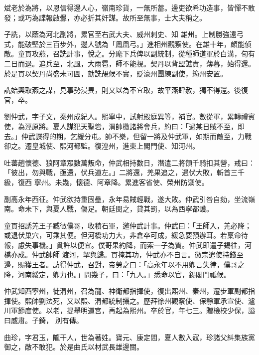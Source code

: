 \begin{pinyinscope}
 斌老於為將，以恩信得邊人心，嶺南珍貨，一無所蓄。邊吏欲希功造事，皆憚不敢發；或巧為諜報啟釁，亦必折其奸謀。故所至無事，士大夫稱之。



 子詵，以蔭為河北副將，累官至右武大夫、威州刺史、知
 雄州。上制勝強遠弓式，能破堅於三百步外，邊人號為「鳳凰弓。」進相州觀察使。在雄十年，頗能偵敵。童貫攻燕，召詵計事，悅之。分麾下兵俾以副統制，從種師道軍於白溝，旬有二日而退。追兵至，北風，大雨雹，師不能視。契丹以背盟譙責，薄暮，始得還。於是貫以契丹尚盛未可圖，劾詵覘候不實，貶濠州團練副使，筠州安置。



 詵始興取燕之謀，見事勢浸異，則又以為不宜取，故平燕肆赦，獨不得還。後復官，卒。



 劉仲武，字子文，秦州成紀人。熙寧中，試射殿庭異等，補官。數從軍，累轉禮賓使，為涇原將。夏人謀犯天聖砦，渭帥檄諸將會兵，約曰：「過某日賊不至，即去。」仲武諜得的期，乞緩分屯。帥不樂，但留一將及仲武軍，如期而敵至，力戰卻之。遷皇城使、熙河都監。復湟州，進東上閣門使、知河州。



 吐蕃趙懷德、狼阿章眾數萬叛命，仲武相持數日，潛遣二將領千騎扣其營，戒曰：「彼出，勿與戰，亟還，伏兵道左。」二將還，羌果追之，遇伏大敗，斬首三千級，復西
 寧州。未幾，懷德、阿章降。累進客省使、榮州防禦使。



 副高永年西征。仲武欲持重固壘，永年易賊輕戰，遂大敗。仲武引咎自劾，坐流嶺南。命未下，與夏人戰，傷足。朝廷閔之，貸其罰，以為西寧都護。



 童貫招誘羌王子臧徵僕哥，收積石軍，邀仲武計事。仲武曰：「王師入，羌必降；或退伏巢穴，可乘其便。但河橋功力大，非倉卒可成，緩急要預辦耳。若稟命待報，慮失事機。」貫許以便宜。僕哥果約降，而索一子為質。仲武即遣子錫往，河橋亦成。仲武帥師
 渡河，挈與歸。貫掩其功，仲武亦不自言。徽宗遣使持錢至邊，賜獲王者。訪得仲武，召對，帝勞之曰：「高永年以不用卿言失律，僕哥之降，河南綏定，卿力也。」問幾子，曰：「九人。」悉命以官，錫閣門祗候。



 仲武知西寧州，徙渭州，召為龍、神衛都指揮使，復出熙州、秦州，遷步軍副都指揮使。熙帥劉法死，又以熙、渭都統制攝之。歷拜徐州觀察使、保靜軍承宣使、瀘川軍節度使。以老，提舉明道宮，再起為熙州。卒於官，年七三。贈檢校少保，謚曰威肅。子錡，
 別有傳。



 曲珍，字君玉，隴干人，世為著姓。寶元、康定間，夏人數入寇，珍諸父糾集族黨御之，敵不敢犯。於是曲氏以材武長雄邊關。




\end{pinyinscope}
